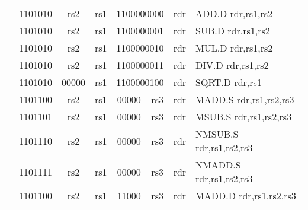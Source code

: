 \begin{table}[p]
\begin{small}
\begin{center}
\begin{tabular}{rcccccccccccl}
&
\multicolumn{2}{|c|}{1101010} &
\multicolumn{1}{c|}{rs2} &
\multicolumn{1}{c|}{rs1} &
\multicolumn{6}{c|}{1100000000} &
\multicolumn{1}{c|}{rdr} & ADD.D rdr,rs1,rs2 \\
\cline{2-12}
  

&
\multicolumn{2}{|c|}{1101010} &
\multicolumn{1}{c|}{rs2} &
\multicolumn{1}{c|}{rs1} &
\multicolumn{6}{c|}{1100000001} &
\multicolumn{1}{c|}{rdr} & SUB.D rdr,rs1,rs2 \\
\cline{2-12}
  

&
\multicolumn{2}{|c|}{1101010} &
\multicolumn{1}{c|}{rs2} &
\multicolumn{1}{c|}{rs1} &
\multicolumn{6}{c|}{1100000010} &
\multicolumn{1}{c|}{rdr} & MUL.D rdr,rs1,rs2 \\
\cline{2-12}
  

&
\multicolumn{2}{|c|}{1101010} &
\multicolumn{1}{c|}{rs2} &
\multicolumn{1}{c|}{rs1} &
\multicolumn{6}{c|}{1100000011} &
\multicolumn{1}{c|}{rdr} & DIV.D rdr,rs1,rs2 \\
\cline{2-12}
  

&
\multicolumn{2}{|c|}{1101010} &
\multicolumn{1}{c|}{00000} &
\multicolumn{1}{c|}{rs1} &
\multicolumn{6}{c|}{1100000100} &
\multicolumn{1}{c|}{rdr} & SQRT.D rdr,rs1 \\
\cline{2-12}
  

&
\multicolumn{2}{|c|}{1101100} &
\multicolumn{1}{c|}{rs2} &
\multicolumn{1}{c|}{rs1} &
\multicolumn{4}{c|}{00000} &
\multicolumn{2}{c|}{rs3} &
\multicolumn{1}{c|}{rdr} & MADD.S rdr,rs1,rs2,rs3 \\
\cline{2-12}
  

&
\multicolumn{2}{|c|}{1101101} &
\multicolumn{1}{c|}{rs2} &
\multicolumn{1}{c|}{rs1} &
\multicolumn{4}{c|}{00000} &
\multicolumn{2}{c|}{rs3} &
\multicolumn{1}{c|}{rdr} & MSUB.S rdr,rs1,rs2,rs3 \\
\cline{2-12}
  

&
\multicolumn{2}{|c|}{1101110} &
\multicolumn{1}{c|}{rs2} &
\multicolumn{1}{c|}{rs1} &
\multicolumn{4}{c|}{00000} &
\multicolumn{2}{c|}{rs3} &
\multicolumn{1}{c|}{rdr} & NMSUB.S rdr,rs1,rs2,rs3 \\
\cline{2-12}
  

&
\multicolumn{2}{|c|}{1101111} &
\multicolumn{1}{c|}{rs2} &
\multicolumn{1}{c|}{rs1} &
\multicolumn{4}{c|}{00000} &
\multicolumn{2}{c|}{rs3} &
\multicolumn{1}{c|}{rdr} & NMADD.S rdr,rs1,rs2,rs3 \\
\cline{2-12}
  

&
\multicolumn{2}{|c|}{1101100} &
\multicolumn{1}{c|}{rs2} &
\multicolumn{1}{c|}{rs1} &
\multicolumn{4}{c|}{11000} &
\multicolumn{2}{c|}{rs3} &
\multicolumn{1}{c|}{rdr} & MADD.D rdr,rs1,rs2,rs3 \\
\cline{2-12}
  


\end{tabular}
\end{center}
\end{small}
\end{table}
